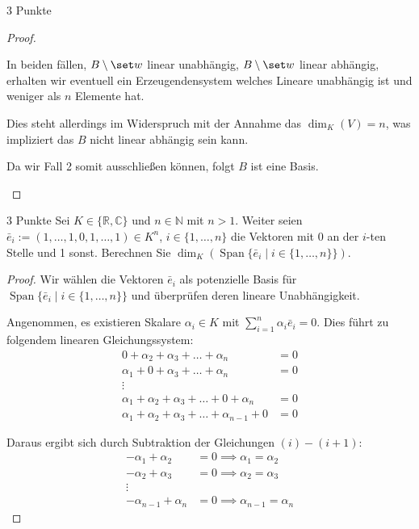 \documentclass{../problemset}
\begin{document}
\begin{problem}{3 Punkte}
\begin{proof}
\begin{itemize}
\begin{itemize}
			            In beiden fällen, $B \setminus \set w$ linear unabhängig, $B \setminus \set w$ linear abhängig,
			            erhalten wir eventuell ein Erzeugendensystem welches Lineare unabhängig ist und weniger als $n$ Elemente hat.

			            Dies steht allerdings im Widerspruch mit der Annahme das $\dim_K(V) = n$, was impliziert das $B$ nicht linear abhängig sein kann.
		      \end{itemize}

		      Da wir Fall 2 somit ausschließen können, folgt $B$ ist eine Basis. \checkmark
	\end{itemize}
\end{proof}
\end{problem}

\begin{problem}{3 Punkte}
Sei $K \in \{ \mathbb{R}, \mathbb{C} \}$ und $n \in \mathbb{N}$ mit $n > 1$. Weiter seien $\bar{e}_i := (1, \ldots, 1, 0, 1, \ldots, 1) \in K^n$, $i \in \{1, \ldots, n\}$ die Vektoren mit 0 an der $i$-ten Stelle und 1 sonst. Berechnen Sie $\dim_K(\operatorname{Span}\{\bar{e}_i \mid i \in \{1, \ldots, n\}\})$.

\begin{proof}
	Wir wählen die Vektoren $\bar{e}_i$ als potenzielle Basis für $\operatorname{Span}\{\bar{e}_i \mid i \in \{1, \ldots, n\}\}$ und überprüfen deren lineare Unabhängigkeit.

	Angenommen, es existieren Skalare $\alpha_i \in K$ mit $\sum_{i=1}^{n} \alpha_i \bar{e}_i = 0$. Dies führt zu folgendem linearen Gleichungssystem:
	\begin{align}
		0 + \alpha_2 + \alpha_3 + \ldots + \alpha_n                & = 0             \\
		\alpha_1 + 0 + \alpha_3 + \ldots + \alpha_n                & = 0             \\
		\vdots                                                          \tag*{}      \\
		\alpha_1 + \alpha_2 + \alpha_3 + \ldots + 0 + \alpha_n     & = 0 \tag{n - 1} \\
		\alpha_1 + \alpha_2 + \alpha_3 + \ldots + \alpha_{n-1} + 0 & = 0 \tag{n}
	\end{align}

	Daraus ergibt sich durch Subtraktion der Gleichungen $(i)-(i+1)$:
	\begin{align*}
		-\alpha_1 + \alpha_2     & = 0 \implies \alpha_1 = \alpha_2     \\
		-\alpha_2 + \alpha_3     & = 0 \implies \alpha_2 = \alpha_3     \\
		\vdots                                                          \\
		-\alpha_{n-1} + \alpha_n & = 0 \implies \alpha_{n-1} = \alpha_n
	\end{align*}


\end{proof}
\end{problem}
\end{document}
